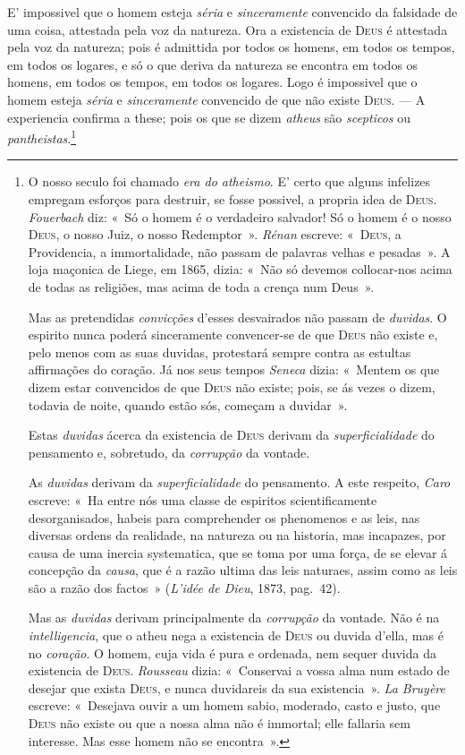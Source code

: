 E' impossivel que o homem esteja \emph{séria} e \emph{sinceramente} convencido da
falsidade de uma coisa, attestada pela voz da natureza. Ora a existencia de
\textsc{Deus} é attestada pela voz da natureza; pois é admittida por todos os homens, em
todos os tempos, em todos os logares, e só o que deriva da natureza se encontra em todos
os homens, em todos os tempos, em todos os logares. Logo é impossivel que o homem esteja
\emph{séria} e \emph{sinceramente} convencido de que não existe \textsc{Deus}. --- A
experiencia confirma a these; pois os que se dizem \emph{atheus} são \emph{scepticos} ou
\emph{pantheistas}.\footnote{O nosso seculo foi chamado \emph{era do atheismo}. E' certo que alguns infelizes
empregam esforços para destruir, se fosse possivel, a propria idea de \textsc{Deus}.
\emph{Fouerbach} diz: «~Só o homem é o verdadeiro salvador! Só o homem é o nosso
\textsc{Deus}, o nosso Juiz, o nosso Redemptor~». \emph{Rénan} escreve: «~\textsc{Deus},
a Providencia, a immortalidade, não passam de palavras velhas e pesadas~». A loja
maçonica de Liege, em 1865, dizia: «~Não só devemos collocar-nos acima de todas as
religiões, mas acima de toda a crença num Deus~».

Mas as pretendidas \emph{convicções} d'esses desvairados não passam de \emph{duvidas}. O
espirito nunca poderá sinceramente convencer-se de que \textsc{Deus} não existe e, pelo
menos com as suas duvidas, protestará sempre contra as estultas affirmações do coração.
Já nos seus tempos \emph{Seneca} dizia: «~Mentem os que dizem estar convencidos de que
\textsc{Deus} não existe; pois, se ás vezes o dizem, todavia de noite, quando estão sós,
começam a duvidar~».

Estas \emph{duvidas} ácerca da existencia de \textsc{Deus} derivam da
\emph{superficialidade} do pensamento e, sobretudo, da \emph{corrupção} da vontade.

As \emph{duvidas} derivam da \emph{superficialidade} do pensamento. A este respeito,
\emph{Caro} escreve: «~Ha entre nós uma classe de espiritos scientificamente
desorganisados, habeis para comprehender os phenomenos e as leis, nas diversas ordens da
realidade, na natureza ou na historia, mas incapazes, por causa de uma inercia
systematica, que se toma por uma força, de se elevar á concepção da \emph{causa}, que é
a razão ultima das leis naturaes, assim como as leis são a razão dos factos~»
(\emph{L'idée de Dieu}, 1873, pag.~42).

Mas as \emph{duvidas} derivam principalmente da \emph{corrupção} da vontade. Não é na
\emph{intelligencia}, que o atheu nega a existencia de \textsc{Deus} ou duvida d'ella,
mas é no \emph{coração}. O homem, cuja vida é pura e ordenada, nem sequer duvida da
existencia de \textsc{Deus}. \emph{Rousseau} dizia: «~Conservai a vossa alma num estado
de desejar que exista \textsc{Deus}, e nunca duvidareis da sua existencia~». \emph{La
Bruyère} escreve: «~Desejava ouvir a um homem sabio, moderado, casto e justo, que
\textsc{Deus} não existe ou que a nossa alma não é immortal; elle fallaria sem
interesse. Mas esse homem não se encontra~».}

